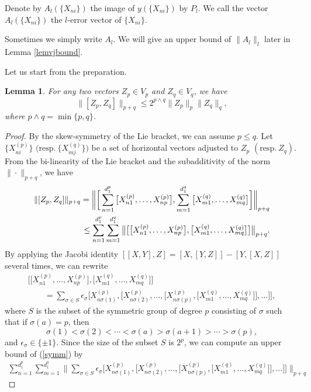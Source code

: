 \documentclass[10pt,a4paper]{amsart}
\numberwithin{equation}{section}
\newtheorem{Lemma}[Theorem]{Lemma}
\begin{document}
\begin{Definition}
 Denote by $A_l(\{X_{ni}\})$ the image of $y(\{X_{ni}\})$ by $P_l$.
 We call the vec\-tor~$A_l(\{X_{ni}\})$ the $l$-error vector of $\{X_{ni}\}$.
\end{Definition}
Sometimes we simply write $A_l$.
We will give an upper bound of $\|A_l\|_l$ later in Lemma \ref{lemvjbound}.

Let us start from the preparation.
\begin{Lemma}\label{lemsubmulti}
 For any two vectors $Z_p\in V_p$ and $Z_q\in V_q$,
 we have
 \[\|[Z_p,Z_q]\|_{p+q}\leq 2^{p\wedge q}\|Z_p\|_p\|Z_q\|_q,\]
 where $p\wedge q=\min\{p,q\}$.
\end{Lemma}

\begin{proof}
 {\sloppy By the skew-symmetry of the Lie bracket,
 we can assume $p\leq q$.
 Let $\bigl\{X_{ni}^{(p)}\bigr\}$ $\bigl(\text{resp.}~\bigl\{X_{mj}^{(q)}\bigr\}\bigr)$ be a set of horizontal vectors adjusted to $Z_p$ $(\text{resp.}~Z_q)$.
From the bi-linearity of the Lie bracket and the subadditivity of the norm $\|\cdot\|_{p+q}$,
we have
\begin{align}
 \|[Z_p,Z_q]\|_{p+q}=\bigg\|\bigg[\sum_{n=1}^{d_1^p}\big[X_{n1}^{(p)},\dots,X_{np}^{(p)}\big], \sum_{m=1}^{d_1^q}\big[X_{m1}^{(q)},\dots,X_{mq}^{(q)}\big]\bigg]\bigg\|_{p+q} \notag \\
 \leq\sum_{n=1}^{d_1^p}\sum_{m=1}^{d_1^q}\big\|\big[\big[X_{n1}^{(p)},\dots,X_{np}^{(p)}\big], \big[X_{m1}^{(q)},\dots,X_{mq}^{(q)}\big]\big]\big\|_{p+q}.\label{symm}
\end{align}}\noindent
By applying the Jacobi identity $[[X,Y],Z]=[X,[Y,Z]]-[Y,[X,Z]]$ several times,
we can rewrite
\begin{gather*}
\bigl[\big[X_{n1}^{(p)},\dots,X_{np}^{(p)}\big],\big[X_{m1}^{(q)},\dots,X_{mq}^{(q)}\big]\bigr]
 \\ \qquad
{} =\sum_{\sigma\in S}\epsilon_{\sigma}\big[X_{n\sigma(1)}^{(p)},\big[X_{n\sigma(2)}^{(p)},\dots, \big[X_{n\sigma(p)}^{(p)},\big[X_{m1}^{(q)},\dots,X_{mq}^{(q)}\big]\big],\ldots\big]\big],
\end{gather*}
where $S$ is the subset of the symmetric group of degree $p$ consisting of $\sigma$ such that if $\sigma(a)=p$,
then
\[
\sigma(1)<\sigma(2)<\cdots<\sigma(a)>\sigma(a+1)>\cdots>\sigma(p),
\]
and $\epsilon_{\sigma}\in\{\pm1\}$.
Since the size of the subset $S$ is $2^p$,
we can compute an upper bound of (\ref{symm}) by
\begin{gather*}
 \sum_{n=1}^{d_1^p}\sum_{m=1}^{d_1^q}\bigg\|\sum_{\sigma\in S}\epsilon_{\sigma}\big[X_{n\sigma(1)}^{(p)},\big[X_{n\sigma(2)}^{(p)},\dots,\big[X_{n\sigma(p)}^{(p)}, \big[X_{m1}^{(q)},\dots,X_{mq}^{(q)}\big]\big],\ldots\big]\big]\bigg\|_{p+q}

\end{gather*}
\end{proof}
\end{document}
